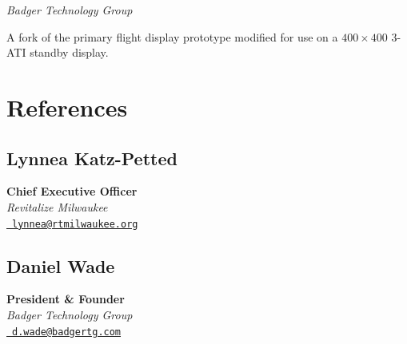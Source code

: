 \documentclass[10pt]{article}
\newcommand{\firstpar}{\vspace{4pt}\noindent}
\begin{document}
\noindent
\textit{Badger Technology Group}

\firstpar
A fork of the primary flight display prototype modified for use on a $400\!\times\!400$ 3-ATI
standby display.

\section*{References}
\begin{multicols}{2}
    \raggedcolumns

    \subsection*{Lynnea Katz-Petted}
    \textbf{Chief Executive Officer} \\
    \textit{Revitalize Milwaukee} \\
    \href{mailto:lynnea@rtmilwaukee.org}{\faEnvelope\ \texttt{lynnea@rtmilwaukee.org}}

    \subsection*{Daniel Wade}
    \textbf{President \& Founder} \\
    \textit{Badger Technology Group} \\
    \href{mailto:d.wade@badgertg.com}{\faEnvelope\ \texttt{d.wade@badgertg.com}}
\end{multicols}
\end{document}
